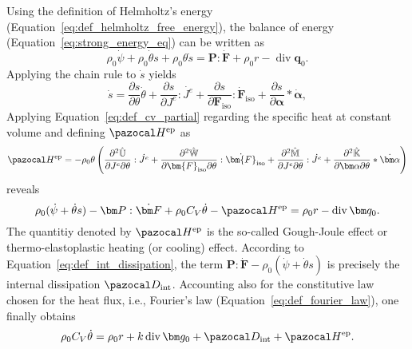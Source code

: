 Using the definition of Helmholtz's energy (Equation~\ref{eq:def_helmholtz_free_energy}), the balance of energy (Equation~\eqref{eq:strong_energy_eq}) can be written as
\begin{equation}
  \rho_0\dot \psi + \rho_0 \dot \theta s + \rho_0 \theta \dot s = \bm P:\dot{\bm F} + \rho_0 r - \operatorname{div}\bm q_0.
\end{equation}
Applying the chain rule to \(\dot s\) yields
\begin{equation}
  \dot s = \frac{\partial s}{\partial \theta}\dot \theta + \frac{\partial s}{\partial J^e }: \dot{J^e} + \frac{\partial s}{\partial \bm F_\text{iso}}: \dot{\bm F}_\text{iso} + \frac{\partial s}{\partial \bm \alpha}*\dot{\bm \alpha},
\end{equation}
Applying Equation~\eqref{eq:def_cv_partial} regarding the specific heat at constant volume and defining \(\pazocal H^\text{ep}\) as
\begin{equation}
    \pazocal H^\text{ep} = - \rho_0\theta\left(\frac{\partial^2 \hat{\mathbb U}}{\partial J^e\partial \theta}: \dot{J^e} + \frac{\partial^2 \hat{\mathbb W}}{\partial \bm{F}_\text{iso}\partial \theta}: \dot{\bm{F}}_\text{iso} + \frac{\partial^2 \hat{\mathbb M}}{\partial J^e\partial \theta}: \dot{J^e} + \frac{\partial^2 \hat{\mathbb K}}{\partial \bm \alpha \partial \theta}*\dot{\bm \alpha} \right)
\end{equation}
reveals
\begin{equation}
  \rho_0 (\dot \psi +  \dot \theta s) - \bm P:\dot{\bm F} + \rho_0 C_V\dot \theta - \pazocal H^\text{ep} = \rho_0 r - \operatorname{div}\bm q_0.
\end{equation}
The quantitiy denoted by \(\pazocal H^\text{ep}\) is the so-called Gough-Joule effect or thermo-elastoplastic heating (or cooling) effect.
According to Equation~\eqref{eq:def_int_dissipation}, the term \(\bm P:\dot{\bm F} - \rho_0(\dot \psi + \dot \theta s)\) is precisely the internal dissipation \(\pazocal D_\text{int}\).
Accounting also for the constitutive law chosen for the heat flux, i.e., Fourier's law (Equation~\eqref{eq:def_fourier_law}), one finally obtains
\begin{equation}
  \rho_0 C_V \dot \theta = \rho_0 r + k\operatorname{div} \bm g_0 + \pazocal D_\text{int} + \pazocal H^\text{ep}.
\end{equation}

